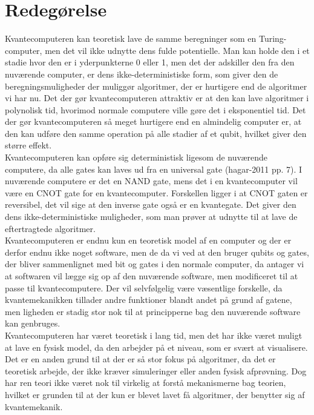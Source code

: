 \documentclass{article}
\begin{document}
\section{Redegørelse}
Kvantecomputeren kan teoretisk lave de samme beregninger som en Turing-computer, men det vil ikke udnytte dens fulde potentielle. Man kan holde den i et stadie hvor den er i yderpunkterne 0 eller 1, men det der adskiller den fra den nuværende computer, er dens ikke-deterministiske form, som giver den de beregningsmuligheder der muliggør algoritmer, der er hurtigere end de algoritmer vi har nu. Det der gør kvantecomputeren attraktiv er at den kan lave algoritmer i polynolisk tid, hvorimod normale computere ville gøre det i eksponentiel tid. Det der gør kvantecomputeren så meget hurtigere end en almindelig computer er, at den kan udføre den samme operation på alle stadier af et qubit, hvilket giver den større effekt.
\\
Kvantecomputeren kan opføre sig deterministisk ligesom de nuværende computere, da alle gates kan laves ud fra en universal gate (hagar-2011 pp. 7). I nuværende computere er det en NAND gate, mens det i en kvantecomputer vil være en CNOT gate for en kvantecomputer. Forskellen ligger i at CNOT gaten er reversibel, det vil sige at den inverse gate også er en kvantegate. Det giver den dens ikke-deterministiske muligheder, som man prøver at udnytte til at lave de eftertragtede algoritmer. 
\\
Kvantecomputeren er endnu kun en teoretisk model af en computer og der er derfor endnu ikke noget software, men de da vi ved at den bruger qubits og gates, der bliver sammenlignet med bit og gates i den normale computer, da antager vi at softwaren vil lægge sig op af den nuværende software, men modificeret til at passe til kvantecomputere. Der vil selvfølgelig være væsentlige forskelle, da kvantemekanikken tillader andre funktioner blandt andet på grund af gatene, men ligheden er stadig stor nok til at principperne bag den nuværende software kan genbruges.
\\
Kvantecomputeren har været teoretisk i lang tid, men det har ikke været muligt at lave en fysisk model, da den arbejder på et niveau, som er svært at visualisere. Det er en anden grund til at der er så stor fokus på algoritmer, da det er teoretisk arbejde, der ikke kræver simuleringer eller anden fysisk afprøvning. Dog har ren teori ikke været nok til virkelig at forstå mekanismerne bag teorien, hvilket er grunden til at der kun er blevet lavet få algoritmer, der benytter sig af kvantemekanik.
\end{document}
